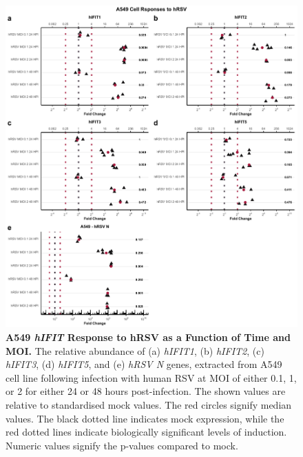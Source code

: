 \begin{figure}
    \centering
    \includegraphics[width=1\linewidth]{06. Chapter 1/Figs/01. Induction/05. a549_hrsv_timepoints.pdf}
    \caption[A549 \textit{hIFIT} Response to hRSV as a Function of Time and MOI.]{\textbf{A549 \textit{hIFIT} Response to hRSV as a Function of Time and MOI.} The relative abundance of (a) \textit{hIFIT1}, (b) \textit{hIFIT2}, (c) \textit{hIFIT3}, (d) \textit{hIFIT5}, and (e) \textit{hRSV N} genes, extracted from A549 cell line following infection with human RSV at MOI of either 0.1, 1, or 2 for either 24 or 48 hours post-infection. The shown values are relative to standardised mock values. The red circles signify median values. The black dotted line indicates mock expression, while the red dotted lines indicate biologically significant levels of induction. Numeric values signify the p-values compared to mock.}
    \label{A549 response to hRSV timepoints}
\end{figure}


